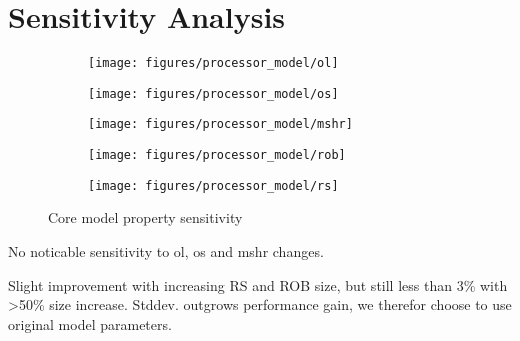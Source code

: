 
\section{Sensitivity Analysis}


\begin{figure}
        \centering
        \begin{subfigure}[b]{0.5\textwidth}
                \texttt{[image: figures/processor\_model/ol]}
                \label{fig:gull}
        \end{subfigure}%
        \begin{subfigure}[b]{0.5\textwidth}
                \texttt{[image: figures/processor\_model/os]}
                \label{fig:tiger}
        \end{subfigure}
        \begin{subfigure}[b]{0.5\textwidth}
                \texttt{[image: figures/processor\_model/mshr]}
                \label{fig:mouse}
        \end{subfigure}%
        \begin{subfigure}[b]{0.5\textwidth}
                \texttt{[image: figures/processor\_model/rob]}
                \label{fig:mouse}
        \end{subfigure}
        \begin{subfigure}[b]{0.5\textwidth}
                \texttt{[image: figures/processor\_model/rs]}
                \label{fig:mouse}
        \end{subfigure}%
        \caption{Core model property sensitivity}\label{fig:animals}
\end{figure}

No noticable sensitivity to ol, os and mshr changes.

Slight improvement with increasing RS and ROB size, but still less than 3\% with >50\% size increase.
Stddev. outgrows performance gain, we therefor choose to use original model parameters.